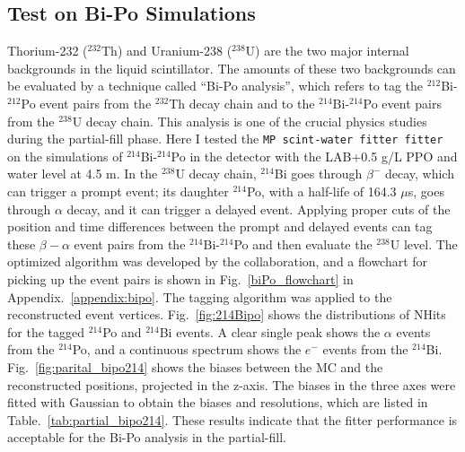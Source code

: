 \subsection{Test on Bi-Po Simulations}\label{sect:bipo}
Thorium-232 ($^{232}$Th) and Uranium-238 ($^{238}$U) are the two major internal backgrounds in the liquid scintillator. The amounts of these two backgrounds can be evaluated by a technique called ``Bi-Po analysis'', which refers to tag the $^{212}$Bi-$^{212}$Po event pairs from the $^{232}$Th decay chain and to the $^{214}$Bi-$^{214}$Po event pairs from the $^{238}$U decay chain. This analysis is one of the crucial physics studies during the partial-fill phase. Here I tested the \texttt{MP scint-water fitter fitter} on the simulations of $^{214}$Bi-$^{214}$Po in the detector with the LAB+0.5 g/L PPO and water level at 4.5 m. In the $^{238}$U decay chain, $^{214}$Bi goes through $\beta^-$ decay, which can trigger a prompt event\cite{nndc}; its daughter $^{214}$Po, with a half-life of 164.3 $\mu$s, goes through $\alpha$ decay, and it can trigger a delayed event. Applying proper cuts of the position and time differences between the prompt and delayed events can tag these $\beta-\alpha$ event pairs from the $^{214}$Bi-$^{214}$Po and then evaluate the $^{238}$U level. The optimized algorithm was developed by the collaboration\cite{joshW1}, and a flowchart for picking up the event pairs is shown in Fig.~\ref{biPo_flowchart} in Appendix.~\ref{appendix:bipo}.
The tagging algorithm was applied to the reconstructed event vertices. Fig.~\ref{fig:214Bipo} shows the distributions of NHits for the tagged $^{214}$Po and $^{214}$Bi events. A clear single peak shows the $\alpha$ events from the $^{214}$Po, and a continuous spectrum shows the $e^-$ events from the $^{214}$Bi. Fig.~\ref{fig:parital_bipo214} shows the biases between the MC and the reconstructed positions, projected in the z-axis. The biases in the three axes were fitted with Gaussian to obtain the biases and resolutions, which are listed in Table.~\ref{tab:partial_bipo214}. These results indicate that the fitter performance is acceptable for the Bi-Po analysis in the partial-fill.

